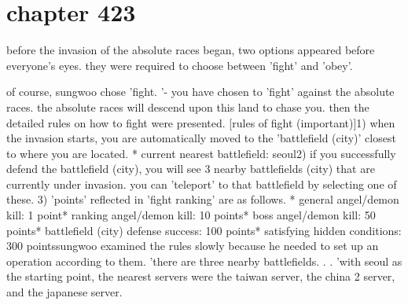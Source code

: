 \section{chapter 423}

before the invasion of the absolute races began, two options appeared before everyone's eyes.
 they were required to choose between 'fight' and 'obey'.





of course, sungwoo chose 'fight.
'- you have chosen to 'fight' against the absolute races.
 the absolute races will descend upon this land to chase you.
then the detailed rules on how to fight were presented.
[rules of fight (important)]1) when the invasion starts, you are automatically moved to the 'battlefield (city)' closest to where you are located.
* current nearest battlefield: seoul2) if you successfully defend the battlefield (city), you will see 3 nearby battlefields (city) that are currently under invasion.
 you can 'teleport' to that battlefield by selecting one of these.
3) 'points' reflected in 'fight ranking' are as follows.
* general angel/demon kill: 1 point* ranking angel/demon kill: 10 points* boss angel/demon kill: 50 points* battlefield (city) defense success: 100 points* satisfying hidden conditions: 300 pointssungwoo examined the rules slowly because he needed to set up an operation according to them.
'there are three nearby battlefields.
.
.
'with seoul as the starting point, the nearest servers were the taiwan server, the china 2 server, and the japanese server.

